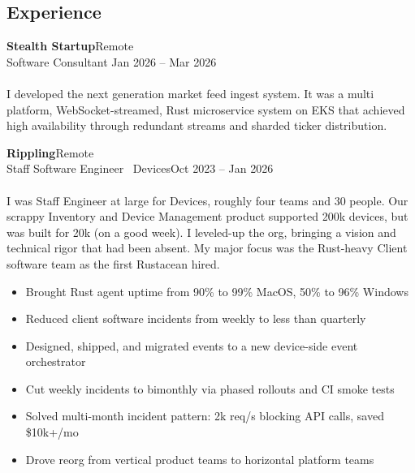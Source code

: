 \documentclass[margin]{res}
\begin{document}
  \begin{resume}
    \section{Experience}
       \textbf{Stealth Startup}\hfill Remote\\
         Software Consultant \hfill Jan 2026 -- Mar 2026\\
         \\
         I developed the next generation market feed ingest system. It was a multi platform, WebSocket-streamed, Rust microservice system
         on EKS that achieved high availability through redundant streams and sharded ticker distribution.


       \textbf{Rippling}\hfill Remote\\
         Staff Software Engineer \textbar \ Devices\hfill Oct 2023 -- Jan 2026\\
         \\
         I was Staff Engineer at large for Devices, roughly four teams and 30 people.
         Our scrappy Inventory and Device Management product supported 200k devices, but was built for 20k (on a good week).
         I leveled-up the org, bringing a vision and technical rigor that had been absent.
         My major focus was the Rust-heavy Client software team as the first Rustacean hired. \\
         \begin{itemize} \itemsep -1pt  %
            \item Brought Rust agent uptime from 90\% to 99\% MacOS, 50\% to 96\% Windows
            \item Reduced client software incidents from weekly to less than quarterly
            \item Designed, shipped, and migrated events to a new device-side event orchestrator
            \item Cut weekly incidents to bimonthly via phased rollouts and CI smoke tests
            \item Solved multi-month incident pattern: 2k req/s blocking API calls, saved \$10k+/mo
            \item Drove reorg from vertical product teams to horizontal platform teams
         \end{itemize}


\end{resume}
\end{document}
